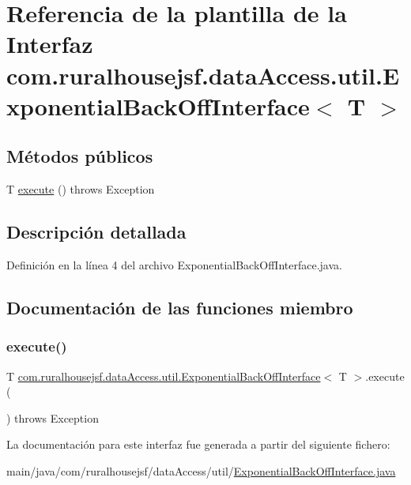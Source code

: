 \hypertarget{interfacecom_1_1ruralhousejsf_1_1data_access_1_1util_1_1_exponential_back_off_interface}{}\section{Referencia de la plantilla de la Interfaz com.\+ruralhousejsf.\+data\+Access.\+util.\+Exponential\+Back\+Off\+Interface$<$ T $>$}
\label{interfacecom_1_1ruralhousejsf_1_1data_access_1_1util_1_1_exponential_back_off_interface}
\subsection*{Métodos públicos}
\begin{DoxyCompactItemize}
\item 
T \mbox{\hyperlink{interfacecom_1_1ruralhousejsf_1_1data_access_1_1util_1_1_exponential_back_off_interface_accad03b4334d95d38315690d30f80b17}{execute}} ()  throws Exception
\end{DoxyCompactItemize}


\subsection{Descripción detallada}


Definición en la línea 4 del archivo Exponential\+Back\+Off\+Interface.\+java.



\subsection{Documentación de las funciones miembro}
\mbox{\label{interfacecom_1_1ruralhousejsf_1_1data_access_1_1util_1_1_exponential_back_off_interface_accad03b4334d95d38315690d30f80b17}} 
\subsubsection{\texorpdfstring{execute()}{execute()}}
{\footnotesize\ttfamily T \mbox{\hyperlink{interfacecom_1_1ruralhousejsf_1_1data_access_1_1util_1_1_exponential_back_off_interface}{com.\+ruralhousejsf.\+data\+Access.\+util.\+Exponential\+Back\+Off\+Interface}}$<$ T $>$.execute (\begin{DoxyParamCaption}{ }\end{DoxyParamCaption}) throws Exception}



La documentación para este interfaz fue generada a partir del siguiente fichero\+:\begin{DoxyCompactItemize}
\item 
main/java/com/ruralhousejsf/data\+Access/util/\mbox{\hyperlink{_exponential_back_off_interface_8java}{Exponential\+Back\+Off\+Interface.\+java}}\end{DoxyCompactItemize}
